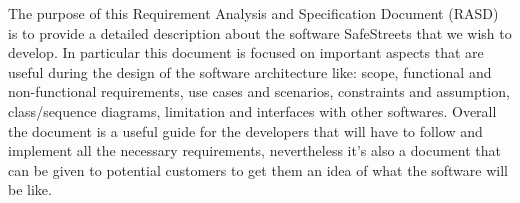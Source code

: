 The purpose of this Requirement Analysis and Specification Document (RASD)
is to provide a detailed description about the software SafeStreets that we wish
to develop. In particular this document is focused on important aspects that are
useful during the design of the software architecture like: scope, functional and
non-functional requirements, use cases and scenarios, constraints and assumption, class/sequence diagrams, limitation and interfaces with other softwares.
Overall the document is a useful guide for the developers that will have to follow
and implement all the necessary requirements, nevertheless it’s also a document
that can be given to potential customers to get them an idea of what the software
will be like.
